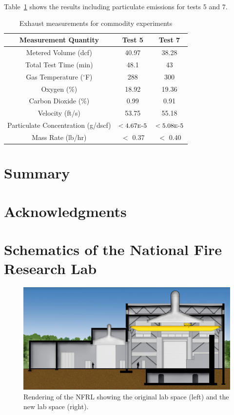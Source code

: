\documentclass[12pt,oneside]{book}
\begin{document}
Table~\ref{tab:part_data} shows the results including particulate emissions for tests 5 and 7.

\begin{table}[!ht]
\centering
\caption{Exhaust measurements for commodity experiments}
\label{tab:part_data}
\begin{tabular}{ccc}
\toprule[1.25pt]
Measurement Quantity & Test 5 & Test 7  \\
\midrule
Metered Volume (dcf)                &  40.97  &  38.28  \\
Total Test Time (min)               &  48.1   &  43     \\
Gas Temperature ($^{\circ}$F)       &  288    &  300    \\
Oxygen (\%)                         &  18.92  &  19.36  \\
Carbon Dioxide (\%)                 &  0.99   &  0.91   \\
Velocity (ft/s)                     &  53.75  &  55.18  \\
Particulate Concentration (g/dscf)  &  $< 4.67\text{\sc{e}-}5$   &  $< 5.08 \text{\sc{e}-}5$  \\
Mass Rate (lb/hr)                   &  $<$ 0.37   &  $<$ 0.40   \\
\bottomrule[1.25pt]
\end{tabular}
\end{table}


\chapter{Summary}

\chapter{Acknowledgments}



\newpage

\appendix
\chapter{Schematics of the National Fire Research Lab}
\label{app:nfrl_images}


\begin{figure}[!ht]
\includegraphics[width=\textwidth]{../Figures/section_2}
\caption {Rendering of the NFRL showing the original lab space (left) and the new lab space (right).}
\label{fig:NFRL_render}
\end{figure}
\end{document}
